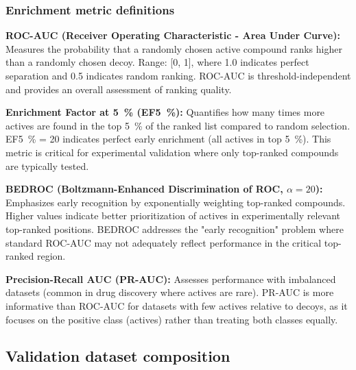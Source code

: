 \documentclass[journal=jcisd8,manuscript=suppinfo]{achemso}
\begin{document}
\subsubsection*{Enrichment metric definitions}

\textbf{ROC-AUC (Receiver Operating Characteristic - Area Under Curve):}
Measures the probability that a randomly chosen active compound ranks higher than a randomly chosen decoy. Range: [0, 1], where 1.0 indicates perfect separation and 0.5 indicates random ranking. ROC-AUC is threshold-independent and provides an overall assessment of ranking quality.

\textbf{Enrichment Factor at \qty{5}{\percent} (EF\qty{5}{\percent}):}
Quantifies how many times more actives are found in the top \qty{5}{\percent} of the ranked list compared to random selection. EF\qty{5}{\percent} = \num{20} indicates perfect early enrichment (all actives in top \qty{5}{\percent}). This metric is critical for experimental validation where only top-ranked compounds are typically tested.

\textbf{BEDROC (Boltzmann-Enhanced Discrimination of ROC, $\alpha = \num{20}$):}
Emphasizes early recognition by exponentially weighting top-ranked compounds. Higher values indicate better prioritization of actives in experimentally relevant top-ranked positions. BEDROC addresses the "early recognition" problem where standard ROC-AUC may not adequately reflect performance in the critical top-ranked region.

\textbf{Precision-Recall AUC (PR-AUC):}
Assesses performance with imbalanced datasets (common in drug discovery where actives are rare). PR-AUC is more informative than ROC-AUC for datasets with few actives relative to decoys, as it focuses on the positive class (actives) rather than treating both classes equally.

\subsection*{Validation dataset composition}
\end{document}
